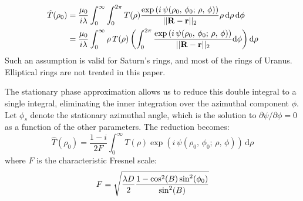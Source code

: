 \documentclass{article}
\theoremstyle{plain}
\begin{document}
        \begin{subequations}
            \begin{align}
                \hat{T}(\rho_{0})
                &=\frac{\mu_{0}}{i\lambda}\int_{0}^{\infty}\int_{0}^{2\pi}
                    T(\rho)
                    \frac{%
                        \exp\left(
                            i\,\psi(\rho_{0},\,\phi_{0};\,\rho,\,\phi)
                        \right)
                    }{%
                        ||\mathbf{R}-\mathbf{r}||_{2}
                    }
                    \rho\,\textrm{d}\rho\,\textrm{d}\phi\\
                &=\frac{\mu_{0}}{i\lambda}\int_{0}^{\infty}
                    \rho\,T(\rho)\left(
                        \int_{0}^{2\pi}
                        \frac{%
                            \exp\left(
                                i\,\psi(\rho_{0},\,\phi_{0};\,\rho,\,\phi)
                            \right)
                        }{%
                            ||\mathbf{R}-\mathbf{r}||_{2}
                        }
                        \textrm{d}\phi
                    \right)
                    \textrm{d}\rho
                \end{align}
        \end{subequations}
        Such an assumption is valid for Saturn's rings, and most of the rings
        of Uranus. Elliptical rings are not treated in this paper.
        \par\hfill\par
        The stationary phase approximation allows us to reduce this double
        integral to a single integral, eliminating the inner integration over
        the azimuthal component $\phi$. Let $\phi_{s}$ denote the stationary
        azimuthal angle, which is the solution to
        $\partial\psi/\partial\phi=0$ as a function of the other
        parameters. The reduction becomes:
        \begin{equation}
            \label{eqn:single_variable_huygens}
            \hat{T}(\rho_{0})
            =\frac{1-i}{2F}\int_{0}^{\infty}
                T(\rho)\exp\left(
                    i\,\psi(\rho_{0},\,\phi_{0};\,\rho,\,\phi)
                \right)
                \,\textrm{d}\rho
        \end{equation}
        where $F$ is the characteristic Fresnel scale:
        \begin{equation}
            \label{eqn:fresnel_scale}
            F=
            \sqrt{%
                \frac{\lambda{D}}{2}%
                \frac{1-\cos^{2}(B)\sin^{2}(\phi_{0})}{\sin^{2}(B)}%
            }
        \end{equation}
\end{document}
